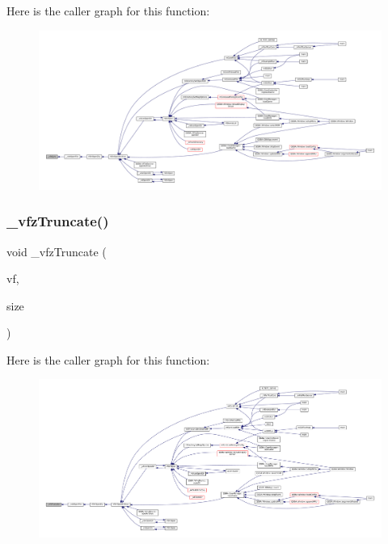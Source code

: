 Here is the caller graph for this function\+:
\nopagebreak
\begin{figure}[H]
\begin{center}
\leavevmode
\includegraphics[width=350pt]{vfs-zip_8c_ae7abdd2e12cc8754b08365ae7544f052_icgraph}
\end{center}
\end{figure}
\mbox{\label{vfs-zip_8c_a2e1b60c1a45619a164b0d2adea1969da}} 
\subsubsection{\texorpdfstring{\+\_\+vfz\+Truncate()}{\_vfzTruncate()}}
{\footnotesize\ttfamily void \+\_\+vfz\+Truncate (\begin{DoxyParamCaption}\item[{struct V\+File $\ast$}]{vf,  }\item[{size\+\_\+t}]{size }\end{DoxyParamCaption})\hspace{0.3cm}{\ttfamily [static]}}

Here is the caller graph for this function\+:
\nopagebreak
\begin{figure}[H]
\begin{center}
\leavevmode
\includegraphics[width=350pt]{vfs-zip_8c_a2e1b60c1a45619a164b0d2adea1969da_icgraph}
\end{center}
\end{figure}
\mbox{\label{vfs-zip_8c_a5a60c5c59fcbcaaa9d72998904f495a0}} 

